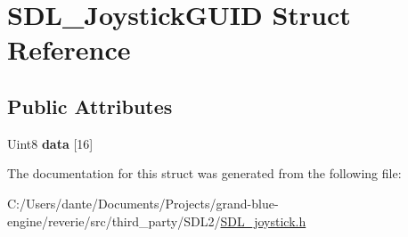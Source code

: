 \hypertarget{struct_s_d_l___joystick_g_u_i_d}{}\section{S\+D\+L\+\_\+\+Joystick\+G\+U\+ID Struct Reference}
\label{struct_s_d_l___joystick_g_u_i_d}
\subsection*{Public Attributes}
\begin{DoxyCompactItemize}
\item 
\mbox{\label{struct_s_d_l___joystick_g_u_i_d_a16935b928a608fe98e0509f242590597}} 
Uint8 {\bfseries data} \mbox{[}16\mbox{]}
\end{DoxyCompactItemize}


The documentation for this struct was generated from the following file\+:\begin{DoxyCompactItemize}
\item 
C\+:/\+Users/dante/\+Documents/\+Projects/grand-\/blue-\/engine/reverie/src/third\+\_\+party/\+S\+D\+L2/\mbox{\hyperlink{_s_d_l__joystick_8h}{S\+D\+L\+\_\+joystick.\+h}}\end{DoxyCompactItemize}
